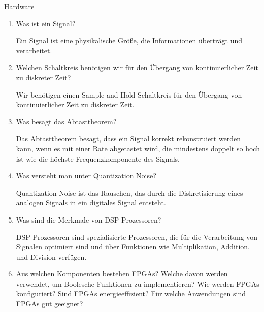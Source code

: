 \documentclass{article}
\begin{document}
\begin{exercise}{Hardware}
  \begin{enumerate}
    \item Was ist ein Signal?

          \begin{solution}
            Ein Signal ist eine physikalische Größe, die Informationen überträgt und verarbeitet.
          \end{solution}

    \item Welchen Schaltkreis benötigen wir für den Übergang von kontinuierlicher Zeit zu diskreter Zeit?

          \begin{solution}
            Wir benötigen einen Sample-and-Hold-Schaltkreis für den Übergang von kontinuierlicher Zeit zu diskreter Zeit.
          \end{solution}

    \item Was besagt das Abtasttheorem?

          \begin{solution}
            Das Abtasttheorem besagt, dass ein Signal korrekt rekonstruiert werden kann, wenn es mit einer Rate abgetastet wird, die mindestens doppelt so hoch ist wie die höchste Frequenzkomponente des Signals.
          \end{solution}

    \item Was versteht man unter Quantization Noise?

          \begin{solution}
            Quantization Noise ist das Rauschen, das durch die Diskretisierung eines analogen Signals in ein digitales Signal entsteht.
          \end{solution}

    \item Was sind die Merkmale von DSP-Prozessoren?

          \begin{solution}
            DSP-Prozessoren sind spezialisierte Prozessoren, die für die Verarbeitung von Signalen optimiert sind und über Funktionen wie Multiplikation, Addition, und Division verfügen.
          \end{solution}

    \item Aus welchen Komponenten bestehen FPGAs? Welche davon werden verwendet, um Boolesche Funktionen zu implementieren? Wie werden FPGAs konfiguriert? Sind FPGAs energieeffizient? Für welche Anwendungen sind FPGAs gut geeignet?


\end{enumerate}
\end{exercise}
\end{document}
